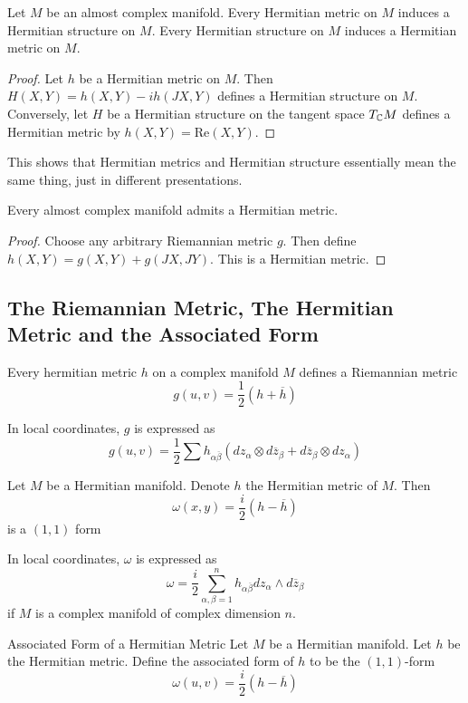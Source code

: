 \documentclass[a4paper]{article}
\begin{document}
\begin{prp}{}{} Let $M$ be an almost complex manifold. Every Hermitian metric on $M$ induces a Hermitian structure on $M$. Every Hermitian structure on $M$ induces a Hermitian metric on $M$. \tcbline
\begin{proof}
Let $h$ be a Hermitian metric on $M$. Then $H(X,Y)=h(X,Y)-ih(JX,Y)$ defines a Hermitian structure on $M$. Conversely, let $H$ be a Hermitian structure on the tangent space $T_{\mathbb{C}} M$ defines a Hermitian metric by $h(X,Y)=\text{Re}(X,Y)$. 
\end{proof}
\end{prp}

This shows that Hermitian metrics and Hermitian structure essentially mean the same thing, just in different presentations. 

\begin{prp}{}{} Every almost complex manifold admits a Hermitian metric. \tcbline
\begin{proof}
Choose any arbitrary Riemannian metric $g$. Then define $h(X,Y)=g(X,Y)+g(JX,JY)$. This is a Hermitian metric. 
\end{proof}
\end{prp}

\subsection{The Riemannian Metric, The Hermitian Metric and the Associated Form}
\begin{prp}{}{} Every hermitian metric $h$ on a complex manifold $M$ defines a Riemannian metric $$g(u,v)=\frac{1}{2}(h+\overline{h})$$
\end{prp}

In local coordinates, $g$ is expressed as $$g(u,v)=\frac{1}{2}\sum h_{\alpha\overline{\beta}}(dz_\alpha\otimes d\overline{z}_\beta+d\overline{z}_\beta\otimes dz_\alpha)$$

\begin{lmm}{}{} Let $M$ be a Hermitian manifold. Denote $h$ the Hermitian metric of $M$. Then $$\omega(x,y)=\frac{i}{2}(h-\overline{h})$$ is a $(1,1)$ form 
\end{lmm}

In local coordinates, $\omega$ is expressed as $$\omega=\frac{i}{2}\sum_{\alpha,\beta=1}^n h_{\alpha\overline{\beta}}dz_{\alpha}\wedge d\overline{z}_\beta$$ if $M$ is a complex manifold of complex dimension $n$. 

\begin{defn}{Associated Form of a Hermitian Metric}{} Let $M$ be a Hermitian manifold. Let $h$ be the Hermitian metric. Define the associated form of $h$ to be the $(1,1)$-form $$\omega(u,v)=\frac{i}{2}(h-\overline{h})$$
\end{defn}
\end{document}
